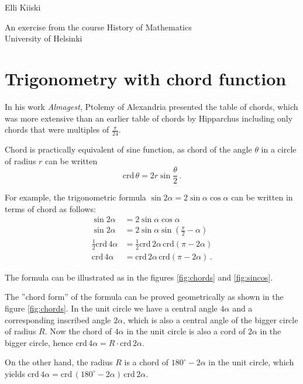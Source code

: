 \documentclass{article}
\begin{document}
{\large
Elli Kiiski
\par
An exercise from the course History of Mathematics\\University of Helsinki
}
\vspace{0.5cm}

\section*{Trigonometry with chord function}

In his work \textit{Almagest}, Ptolemy of Alexandria presented the table of chords, which was more extensive than an earlier table of chords by Hipparchus including only chords that were multiples of $\frac{\pi}{24}$.

Chord is practically equivalent of sine function, as chord of the angle $\theta$ in a circle of radius $r$ can be written
\begin{equation*}
    \text{crd}\,\theta=2r\sin{\frac{\theta}{2}}\,.
\end{equation*}

For example, the trigonometric formula $\sin{2\alpha}=2\sin{\alpha}\cos{\alpha}$ can be written in terms of chord as follows:
\begin{align*}
    \sin{2\alpha} & = 2\sin{\alpha}\cos{\alpha}\\
    \sin{2\alpha} & = 2\sin{\alpha}\sin{(\frac{\pi}{2}-\alpha)}\\
    \frac{1}{2}\text{crd}\,4\alpha & = \frac{1}{2}\text{crd}\,{2\alpha}\, \text{crd}{(\pi-2\alpha)}\\
    \text{crd}\,4\alpha & = \text{crd}\,{2\alpha}\, \text{crd}{(\pi-2\alpha)}\,.
\end{align*}

The formula can be illustrated as in the figures \ref{fig:chords} and \ref{fig:sincos}.

The ''chord form'' of the formula can be proved geometrically as shown in the figure \ref{fig:chords}. In the unit circle we have a central angle $4\alpha$ and a corresponding inscribed angle $2\alpha$, which is also a central angle of the bigger circle of radius $R$. Now the chord of $4\alpha$ in the unit circle is also a cord of $2\alpha$ in the bigger circle, hence $\text{crd}\,4\alpha=R\cdot\text{crd}\,2\alpha$.

On the other hand, the radius $R$ is a chord of $180^{\circ}-2\alpha$ in the unit circle, which yields $\text{crd}\,4\alpha=\text{crd}\,(180^{\circ}-2\alpha)\,\text{crd}\,2\alpha$.
\end{document}
